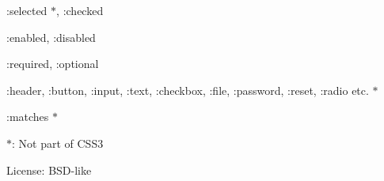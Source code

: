 \begin{DoxyItemize}
\begin{DoxyItemize}
\item {\ttfamily \+:selected} $\ast$, {\ttfamily \+:checked}
\item {\ttfamily \+:enabled}, {\ttfamily \+:disabled}
\item {\ttfamily \+:required}, {\ttfamily \+:optional}
\item {\ttfamily \+:header}, {\ttfamily \+:button}, {\ttfamily \+:input}, {\ttfamily \+:text}, {\ttfamily \+:checkbox}, {\ttfamily \+:file}, {\ttfamily \+:password}, {\ttfamily \+:reset}, {\ttfamily \+:radio} etc. $\ast$
\item {\ttfamily \+:matches} $\ast$
\end{DoxyItemize}
\end{DoxyItemize}

{\bfseries $\ast$}\+: Not part of C\+S\+S3 



License\+: B\+S\+D-\/like 